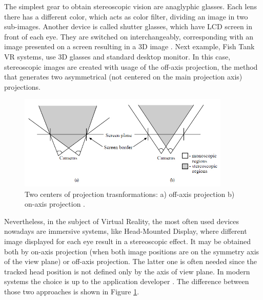 The simplest gear to obtain stereoscopic vision are anaglyphic glasses. Each lens there has a different color, which acts as color filter, dividing an image in two sub-images. Another device is called shutter glasses, which have LCD screen in front of each eye. They are switched on interchangeably, corresponding with an image presented on a screen resulting in a 3D image \cite{Lacrama07}.
Next example, Fish Tank VR systems, use 3D glasses and standard desktop monitor. In this case, stereoscopic images are created with usage of the off-axis projection, the method that generates two asymmetrical (not centered on the main projection axis) projections.
\begin{figure}[h]
\centering    
\includegraphics[width=0.9\textwidth]{Figs/projections.jpg}
\caption{Two centers of projection trasnformations: a) off-axis projection b) on-axis projection \cite{Mazuryk96}.}
\label{fig:projections} 
\end{figure} 
Nevertheless, in the subject of Virtual Reality, the most often used devices nowadays are immersive systems, like Head-Mounted Display, where different image displayed for each eye result in a stereoscopic effect. It may be obtained both by on-axis projection (when both image positions are on the symmetry axis of the view plane) or off-axis projection. The latter one is often needed since the tracked head position is not defined only by the axis of view plane. In modern systems the choice is up to the application developer \cite{Mazuryk96, Wikibook15}. The difference between those two approaches is shown in Figure \ref{fig:projections}.

